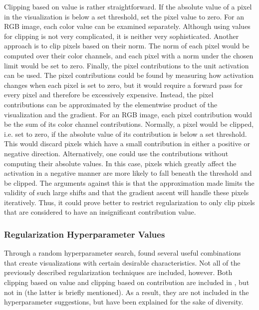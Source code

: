 \noindent Clipping based on value is rather straightforward. If the absolute value of a pixel in the visualization is below a set threshold, set the pixel value to zero. For an RGB image, each color value can be examined separately. Although using values for clipping is not very complicated, it is neither very sophisticated. Another approach is to clip pixels based on their norm. The norm of each pixel would be computed over their color channels, and each pixel with a norm under the chosen limit would be set to zero. Finally, the pixel contributions to the unit activation can be used. The pixel contributions could be found by measuring how activation changes when each pixel is set to zero, but it would require a forward pass for every pixel and therefore be excessively expensive. Instead, the pixel contributions can be approximated by the elementwise product of the visualization and the gradient. For an RGB image, each pixel contribution would be the sum of its color channel contributions. Normally, a pixel would be clipped, i.e. set to zero, if the absolute value of its contribution is below a set threshold. This would discard pixels which have a small contribution in either a positive or negative direction. Alternatively, one could use the contributions without computing their absolute values. In this case, pixels which greatly affect the activation in a negative manner are more likely to fall beneath the threshold and be clipped. The arguments against this is that the approximation made limits the validity of such large shifts and that the gradient ascent will handle these pixels iteratively. Thus, it could prove better to restrict regularization to only clip pixels that are considered to have an insignificant contribution value. 

\subsubsection{Regularization Hyperparameter Values}

Through a random hyperparameter search, \cite{deepvis} found several useful combinations that create visualizations with certain desirable characteristics. Not all of the previously described regularization techniques are included, however. Both clipping based on value and clipping based on contribution are included in \cite{deepvis_web}, but not in \cite{deepvis} (the latter is briefly mentioned). As a result, they are not included in the hyperparameter suggestions, but have been explained for the sake of diversity. \\

